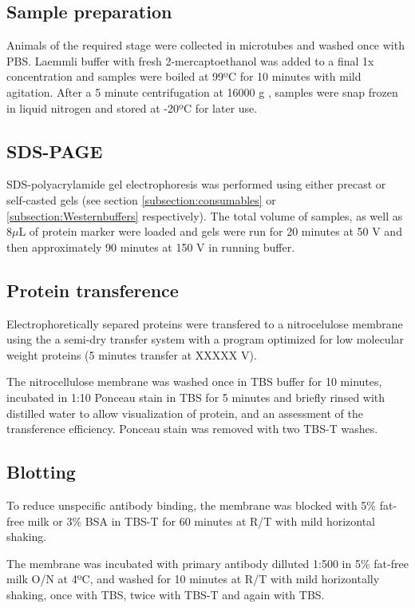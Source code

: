 \documentclass[11pt,twoside,a4paper]{report}
\begin{document}
			\subsection{Sample preparation}
			Animals of the required stage were collected in microtubes and washed once with PBS. Laemmli buffer with fresh 2-mercaptoethanol was added to a final 1x concentration and samples were boiled at 99ºC for 10 minutes with mild agitation. After a 5 minute centrifugation at 16000 g , samples were snap frozen in liquid nitrogen and stored at -20ºC for later use.
			
			\subsection{SDS-PAGE}
			SDS-polyacrylamide gel electrophoresis was performed using either precast or self-casted gels (see section \ref{subsection:consumables} or \ref{subsection:Westernbuffers} respectively). The total volume of samples, as well as 8$\mu$L of protein marker were loaded and gels were run for 20 minutes at 50 V and then approximately 90 minutes at 150 V in running buffer.
			
			\subsection{Protein transference}
			Electrophoretically separed proteins were transfered to a nitrocelulose membrane using the a semi-dry transfer system with a program optimized for low molecular weight proteins (5 minutes transfer at XXXXX V).
			
			The nitrocellulose membrane was washed once in TBS buffer for 10 minutes, incubated in 1:10 Ponceau stain in TBS for 5 minutes and briefly rinsed with distilled water to allow visualization of protein, and an assessment of the transference efficiency. Ponceau stain was removed with two TBS-T washes.
			\subsection{Blotting}
			To reduce unspecific antibody binding, the membrane was blocked with 5\% fat-free milk or 3\% BSA in TBS-T for 60 minutes at R/T with mild horizontal shaking.
			
			The membrane was incubated with primary antibody dilluted 1:500 in 5\% fat-free milk O/N at 4ºC, and washed for 10 minutes at R/T with mild horizontally shaking, once with TBS, twice with TBS-T and again with TBS.
			
\end{document}
